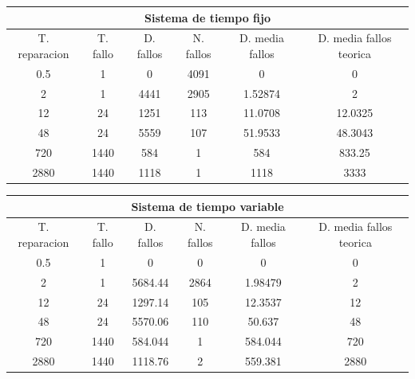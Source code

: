 \documentclass[12pt, spanish]{article}
\begin{document}
\begin{table}[H]
\begin{tabular}{|c|c|c|c|c|c|}
\hline
\multicolumn{6}{|c|}{\textbf{Sistema de tiempo fijo}}                                          \\ \hline
T. reparacion & T. fallo & D. fallos & N. fallos & D. media fallos & D. media fallos teorica \\ \hline
0.5           & 1        & 0         & 4091      & 0               & 0                       \\ \hline
2             & 1        & 4441      & 2905      & 1.52874         & 2                       \\ \hline
12            & 24       & 1251      & 113       & 11.0708         & 12.0325                 \\ \hline
48            & 24       & 5559      & 107       & 51.9533         & 48.3043                 \\ \hline
720           & 1440     & 584       & 1         & 584             & 833.25                  \\ \hline
2880          & 1440     & 1118      & 1         & 1118            & 3333							\\ \hline
\end{tabular}
\end{table}

\begin{table}[H]
\begin{tabular}{|c|c|c|c|c|c|}
\hline
\multicolumn{6}{|c|}{\textbf{Sistema de tiempo variable}}                                      \\ \hline
T. reparacion & T. fallo & D. fallos & N. fallos & D. media fallos & D. media fallos teorica \\ \hline
0.5           & 1        & 0         & 0         & 0               & 0                       \\ \hline
2             & 1        & 5684.44   & 2864      & 1.98479         & 2                       \\ \hline
12            & 24       & 1297.14   & 105       & 12.3537         & 12                      \\ \hline
48            & 24       & 5570.06   & 110       & 50.637          & 48                      \\ \hline
720           & 1440     & 584.044   & 1         & 584.044         & 720                     \\ \hline
2880          & 1440     & 1118.76   & 2         & 559.381         & 2880							\\ \hline
\end{tabular}
\end{table}
\end{document}
